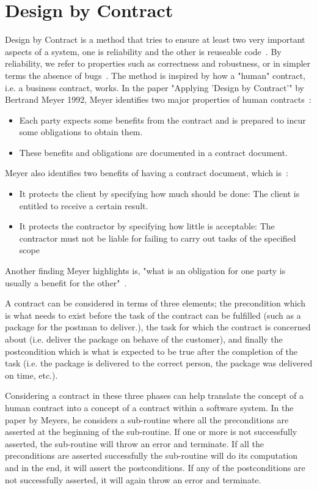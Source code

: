 \section{Design by Contract}\label{sec:DbC}

Design by Contract is a method that tries to ensure at least two very important aspects of a system, one is reliability and the other is reuseable code~\cite{Bertrand_DbC}.
By reliability, we refer to properties such as correctness and robustness, or in simpler terms the absence of bugs~\cite{Bertrand_DbC}.
The method is inspired by how a "human" contract, i.e. a business contract, works.
In the paper "Applying 'Design by Contract'" by Bertrand Meyer 1992, Meyer identifies two major properties of human contracts~\cite{Bertrand_DbC}:
\begin{itemize}
    \item Each party expects some benefits from the contract and is prepared to incur some obligations to obtain them.
    \item These benefits and obligations are documented in a contract document.
\end{itemize}

Meyer also identifies two benefits of having a contract document, which is~\cite{Bertrand_DbC}:
\begin{itemize}
    \item It protects the client by specifying how much should be done: The client is entitled to receive a certain result.
    \item It protects the contractor by specifying how little is acceptable: The contractor must not be liable for failing to carry out tasks of the specified scope
\end{itemize}

Another finding Meyer highlights is, "what is an obligation for one party is usually a benefit for the other"~\cite{Bertrand_DbC}.

A contract can be considered in terms of three elements; the precondition which is what needs to exist before the task of the contract can be fulfilled (such as a package for the postman to deliver.), the task for which the contract is concerned about (i.e. deliver the package on behave of the customer), and finally the postcondition which is what is expected to be true after the completion of the task (i.e. the package is delivered to the correct person, the package was delivered on time, etc.).

Considering a contract in these three phases can help translate the concept of a human contract into a concept of a contract within a software system. In the paper by Meyers, he considers a sub-routine where all the preconditions are asserted at the beginning of the sub-routine.
If one or more is not successfully asserted, the sub-routine will throw an error and terminate. 
If all the preconditions are asserted successfully the sub-routine will do its computation and in the end, it will assert the postconditions. 
If any of the postconditions are not successfully asserted, it will again throw an error and terminate.

